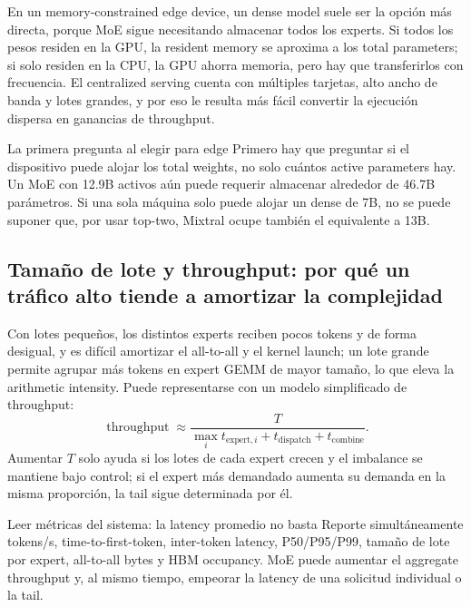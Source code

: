 \documentclass[a4paper]{article}
\begin{document}
En un memory-constrained edge device, un dense model suele ser la opción más directa, porque MoE sigue necesitando almacenar todos los experts. Si todos los pesos residen en la GPU, la resident memory se aproxima a los total parameters; si solo residen en la CPU, la GPU ahorra memoria, pero hay que transferirlos con frecuencia. El centralized serving cuenta con múltiples tarjetas, alto ancho de banda y lotes grandes, y por eso le resulta más fácil convertir la ejecución dispersa en ganancias de throughput.

\begin{importantbox}{La primera pregunta al elegir para edge}
Primero hay que preguntar si el dispositivo puede alojar los total weights, no solo cuántos active parameters hay. Un MoE con 12.9B activos aún puede requerir almacenar alrededor de 46.7B parámetros. Si una sola máquina solo puede alojar un dense de 7B, no se puede suponer que, por usar top-two, Mixtral ocupe también el equivalente a 13B.
\end{importantbox}


\subsection{Tamaño de lote y throughput: por qué un tráfico alto tiende a amortizar la complejidad}

Con lotes pequeños, los distintos experts reciben pocos tokens y de forma desigual, y es difícil amortizar el all-to-all y el kernel launch; un lote grande permite agrupar más tokens en expert GEMM de mayor tamaño, lo que eleva la arithmetic intensity. Puede representarse con un modelo simplificado de throughput:
\[
\operatorname{throughput}\approx \frac{T}{\max_i t_{\text{expert},i}+t_{\text{dispatch}}+t_{\text{combine}}}.
\]
Aumentar $T$ solo ayuda si los lotes de cada expert crecen y el imbalance se mantiene bajo control; si el expert más demandado aumenta su demanda en la misma proporción, la tail sigue determinada por él.

\begin{knowledgebox}{Leer métricas del sistema: la latency promedio no basta}
Reporte simultáneamente tokens/s, time-to-first-token, inter-token latency, P50/P95/P99, tamaño de lote por expert, all-to-all bytes y HBM occupancy. MoE puede aumentar el aggregate throughput y, al mismo tiempo, empeorar la latency de una solicitud individual o la tail.
\end{knowledgebox}
\end{document}
